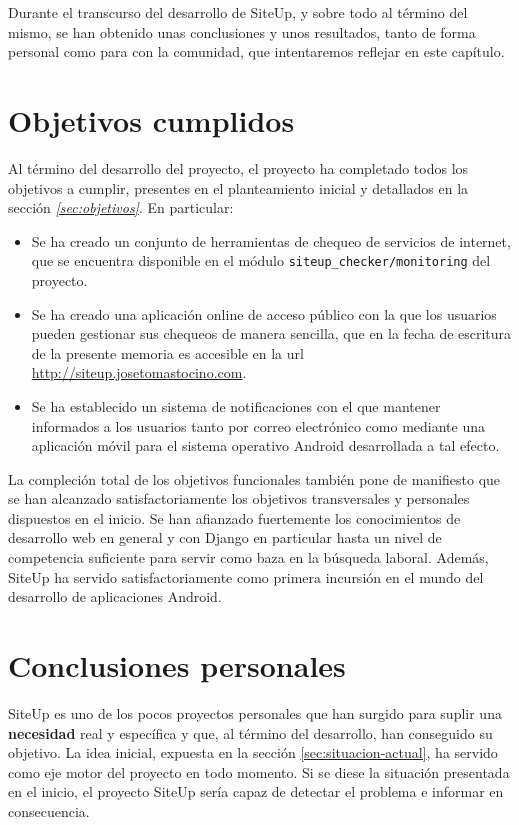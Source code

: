 Durante el transcurso del desarrollo de SiteUp, y sobre todo al término del
mismo, se han obtenido unas conclusiones y unos resultados, tanto de forma
personal como para con la comunidad, que intentaremos reflejar en este capítulo.


\section{Objetivos cumplidos}
Al término del desarrollo del proyecto, el proyecto ha completado todos los
objetivos a cumplir, presentes en el planteamiento inicial y detallados en la
sección \textit{\ref{sec:objetivos}}. En particular:

\begin{itemize}
\item Se ha creado un conjunto de herramientas de chequeo de servicios de
  internet, que se encuentra disponible en el módulo
  \texttt{siteup\_checker/monitoring} del proyecto.
\item Se ha creado una aplicación online de acceso público con la que los
  usuarios pueden gestionar sus chequeos de manera sencilla, que en la fecha de
  escritura de la presente memoria es accesible en la url
  \url{http://siteup.josetomastocino.com}.
\item Se ha establecido un sistema de notificaciones con el que mantener
  informados a los usuarios tanto por correo electrónico como mediante una
  aplicación móvil para el sistema operativo Android desarrollada a tal efecto.
\end{itemize}

La compleción total de los objetivos funcionales también pone de manifiesto que
se han alcanzado satisfactoriamente los objetivos transversales y personales
dispuestos en el inicio. Se han afianzado fuertemente los conocimientos de
desarrollo web en general y con Django en particular hasta un nivel de
competencia suficiente para servir como baza en la búsqueda laboral. Además,
SiteUp ha servido satisfactoriamente como primera incursión en el mundo del
desarrollo de aplicaciones Android.

\section{Conclusiones personales}

SiteUp es uno de los pocos proyectos personales que han surgido para suplir una
\textbf{necesidad} real y específica y que, al término del desarrollo, han
conseguido su objetivo. La idea inicial, expuesta en la sección
\ref{sec:situacion-actual}, ha servido como eje motor del proyecto en todo
momento. Si se diese la situación presentada en el inicio, el proyecto SiteUp
sería capaz de detectar el problema e informar en consecuencia. 

